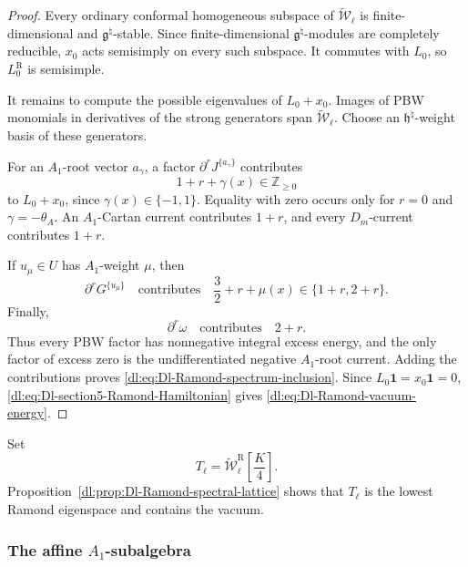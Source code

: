 \documentclass[11pt,reqno]{amsart}
\theoremstyle{definition}
\theoremstyle{remark}
\begin{document}
\begin{proof}
Every ordinary conformal homogeneous subspace of
\(\widetilde{\mathcal W}_\ell\) is finite-dimensional and
\(\mathfrak g^\natural\)-stable.  Since finite-dimensional
\(\mathfrak g^\natural\)-modules are completely reducible, \(x_0\)
acts semisimply on every such subspace.  It commutes with \(L_0\), so
\(L_0^{\mathrm R}\) is semisimple.

It remains to compute the possible eigenvalues of \(L_0+x_0\).
Images of PBW monomials in derivatives of the strong generators span
\(\widetilde{\mathcal W}_\ell\).  Choose an
\(\mathfrak h^\natural\)-weight basis of these generators.

For an \(A_1\)-root vector \(a_\gamma\), a factor
\(\partial^rJ^{\{a_\gamma\}}\) contributes
\begin{equation*}
  1+r+\gamma(x)
  \in\mathbb Z_{\ge0}
\end{equation*}
to \(L_0+x_0\), since
\(\gamma(x)\in\{-1,1\}\).  Equality with zero occurs only for
\(r=0\) and \(\gamma=-\theta_A\).  An \(A_1\)-Cartan current
contributes \(1+r\), and every \(D_m\)-current contributes \(1+r\).

If \(u_\mu\in U\) has \(A_1\)-weight \(\mu\), then
\begin{equation*}
  \partial^rG^{\{u_\mu\}}
  \quad\text{contributes}\quad
  \frac32+r+\mu(x)
  \in\{1+r,2+r\}.
\end{equation*}
Finally,
\begin{equation*}
  \partial^r\omega
  \quad\text{contributes}\quad
  2+r.
\end{equation*}
Thus every PBW factor has nonnegative integral excess energy, and the
only factor of excess zero is the undifferentiated negative
\(A_1\)-root current.  Adding the contributions proves
\eqref{dl:eq:Dl-Ramond-spectrum-inclusion}.  Since
\(L_0\mathbf1=x_0\mathbf1=0\),
\eqref{dl:eq:Dl-section5-Ramond-Hamiltonian} gives
\eqref{dl:eq:Dl-Ramond-vacuum-energy}.
\end{proof}

Set
\begin{equation*}
  T_\ell
  =
  \widetilde{\mathcal W}_\ell^{\mathrm R}
  \!\left[\frac K4\right].
\end{equation*}
Proposition~\ref{dl:prop:Dl-Ramond-spectral-lattice} shows that
\(T_\ell\) is the lowest Ramond eigenspace and contains the vacuum.

\subsubsection{The affine \(A_1\)-subalgebra}
\end{document}

